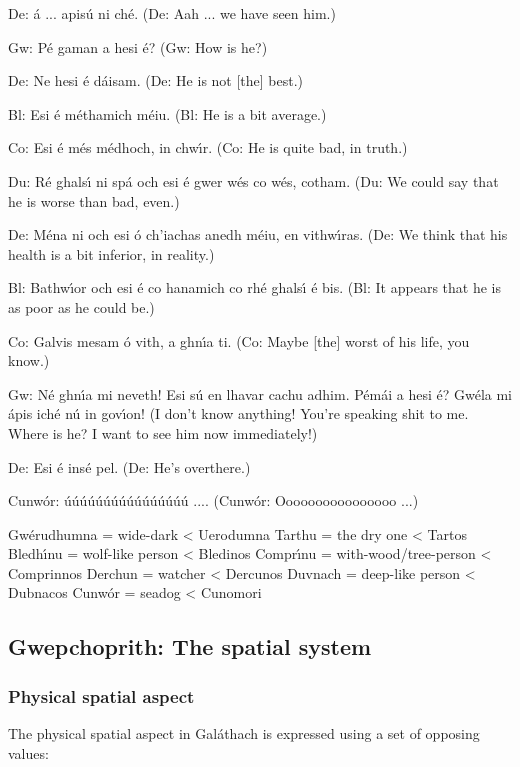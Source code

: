 De: \'{a} ... apis\'{u} ni ch\'{e}.
(De: Aah ... we have seen him.)

Gw: P\'{e} gaman a hesi \'{e}?
(Gw: How is he?)

De: Ne hesi \'{e} d\'{a}isam.
(De: He is not [the] best.)

Bl: Esi \'{e} m\'{e}thamich m\'{e}iu.
(Bl: He is a bit average.)

Co: Esi \'{e} m\'{e}s m\'{e}dhoch, in chw\'{\i}r.
(Co: He is quite bad, in truth.)

Du: R\'{e} ghals\'{\i} ni sp\'{a} och esi \'{e} gwer w\'{e}s co w\'{e}s, cotham.
(Du: We could say that he is worse than bad, even.)

De: M\'{e}na ni och esi \'{o} ch’iachas anedh m\'{e}iu, en vithw\'{\i}ras.
(De: We think that his health is a bit inferior, in reality.)

Bl: Bathw\'{\i}or och esi \'{e} co hanamich co rh\'{e} ghals\'{\i} \'{e} bis.
(Bl: It appears that he is as poor as he could be.)

Co: Galvis mesam \'{o} vith, a ghn\'{\i}a ti.
(Co: Maybe [the] worst of his life, you know.)

Gw: N\'{e} ghn\'{\i}a mi neveth! Esi s\'{u} en lhavar cachu adhim. P\'{e}m\'{a}i a hesi \'{e}? Gw\'{e}la mi \'{a}pis ich\'{e} n\'{u} in gov\'{\i}on!
(I don't know anything! You’re speaking shit to me. Where is he? I want to see him now immediately!)

De: Esi \'{e} ins\'{e} pel.
(De: He’s overthere.)

Cunw\'{o}r: \'{u}\'{u}\'{u}\'{u}\'{u}\'{u}\'{u}\'{u}\'{u}\'{u}\'{u}\'{u}\'{u}\'{u}\'{u}\'{u} ....
(Cunw\'{o}r: Oooooooooooooooo ...)


Gw\'{e}rudhumna = wide-dark < Uerodumna
Tarthu = the dry one < Tartos
Bledh\'{\i}nu = wolf-like person < Bledinos
Compr\'{\i}nu = with-wood/tree-person < Comprinnos
Derchun = watcher < Dercunos
Duvnach = deep-like person < Dubnacos
Cunw\'{o}r = seadog < Cunomori


\subsection{Gwepchoprith: The spatial system}
\subsubsection{Physical spatial aspect}

The physical spatial aspect in Gal\'{a}thach is expressed using a set of opposing values:

